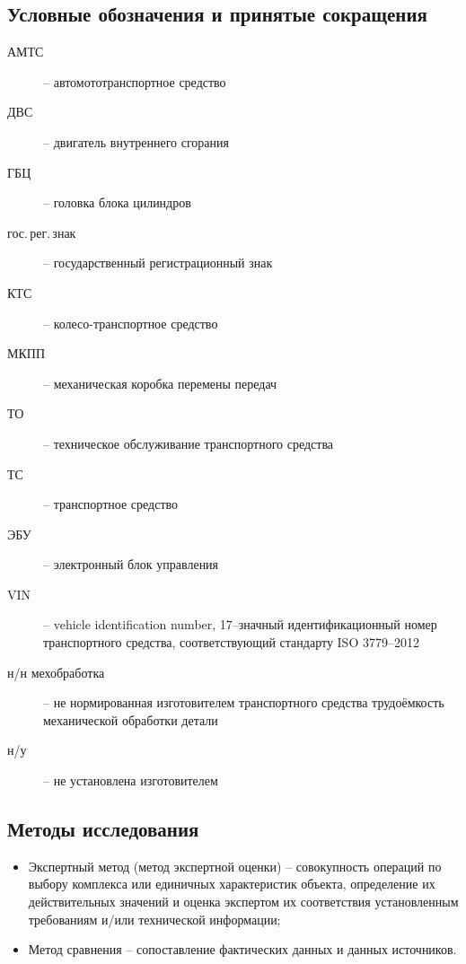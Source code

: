 \subsection{Условные обозначения и принятые сокращения}
\begin{description}
%	 
\item[АМТС] -- автомототранспортное средство
\item[ДВС] -- двигатель внутреннего сгорания
\item[ГБЦ] -- головка блока цилиндров
\item[гос.\,рег.\,знак] -- государственный регистрационный знак
\item[КТС] -- колесо-транспортное средство 
\item[МКПП] -- механическая коробка перемены передач
\item[ТО] -- техническое обслуживание транспортного средства
\item[ТС] -- транспортное средство
\item[ЭБУ] -- электронный блок управления
\item[VIN] -- vehicle identification number, 17--значный идентификационный номер транспортного средства, соответствующий стандарту ISO 3779--2012
\item[н/н мехобработка] -- не нормированная изготовителем транспортного средства трудоёмкость механической обработки детали
\item[н/у] -- не установлена изготовителем  
%
\end{description}
\subsection{Методы исследования}
\begin{itemize}
\item Экспертный метод (метод экспертной оценки) -- совокупность операций по выбору комплекса или единичных характеристик объекта, определение их действительных значений и оценка экспертом их соответствия установленным требованиям и/или технической информации;
\item Метод сравнения -- сопоставление фактических данных и данных источников.
\end{itemize}

